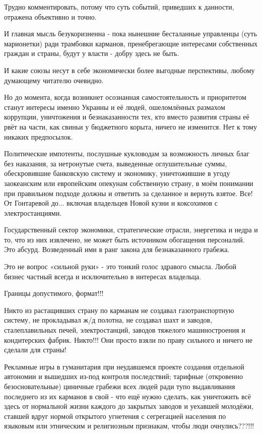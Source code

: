 \begin{itemize}
\begin{itemize}
\end{itemize}


Трудно комментировать, потому что суть событий, приведших к данности, отражена объективно и точно.

И главная мысль безукоризненна - пока нынешние бесталанные управленцы (суть
марионетки) ради трамбовки карманов, пренебрегающие интересами собственных
граждан и страны, будут у власти - добру здесь не быть.

И какие союзы несут в себе экономически более выгодные перспективы, любому
думающему читателю очевидно.

Но до момента, когда возникнет осознанная самостоятельность и приоритетом
станут интересы именно Украины и её людей, ошеломлённых размахом коррупции,
уничтожения и безнаказанности тех, кто вместо развития страны её рвёт на части,
как свиньи у бюджетного корыта, ничего не изменится. Нет к тому никаких
предпосылок.

Политические импотенты, послушные кукловодам за возможность личных благ без
наказания, за нетронутые счета, выведенные оглушительные суммы, обескровившие
банковскую систему и экономику, уничтожившие в угоду заокеанским или
европейским опекунам собственную страну, в моём понимании при правильном
подходе должны и ответить за сделанное и вернуть взятое. Все! От Гонтаревой до...
включая владельцев Новой кузни и коксохимов с электростанциями.

Государственный сектор экономики, стратегические отрасли, энергетика и недра и
то, что из них извлечено, не может быть источником обогащения персоналий. Это
абсурд. Возведенный ими в ранг закона для безнаказанного грабежа.

Это не вопрос «сильной руки» - это тонкий голос здравого смысла. Любой бизнес
частный всегда и исключительно в интересах владельца.

Границы допустимого, формат!!!

Никто из растащивших страну по карманам не создавал газотранспортную систему,
не прокладывал ж/д полотна, не создавал шахт и заводов, сталеплавильных печей,
электростанций, заводов тяжелого машиностроения и кондитерских фабрик. Никто!!!
Они просто взяли по праву сильного и ничего не сделали для страны!

Рекламные игры в гуманитария при неудавшемся проекте создания отдельной
автономии и вышедших из-под контроля последствий; тарифные (откровенно
безосновательные) циничные грабежи всех людей ради тупо выдавливания последнего
из их карманов в свой - что ещё нужно сделать, как уничтожить всё здесь от
нормальной жизни каждого до закрытых заводов и уехавшей молодёжи, ставшей вдруг
нормой открытого угнетения с сегрегацией населения по языковым или этническим и
религиозным признакам, чтобы люди очнулись???!!!


\end{itemize}
